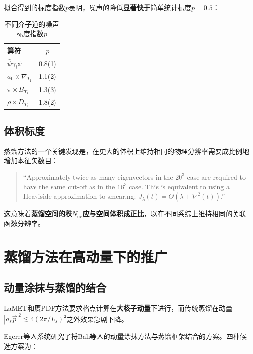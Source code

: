 \documentclass[12pt,a4paper]{ctexart}
\theoremstyle{definition}
\begin{document}
拟合得到的标度指数$p$表明，噪声的降低\textbf{显著快于}简单统计标度$p = 0.5$：

\begin{table}[H]
\centering
\caption{不同介子道的噪声标度指数$p$\cite{Peardon2009}}
\label{tab:noise_exponents}
\begin{tabular}{lc}
\toprule
算符 & $p$ \\
\midrule
$\bar{\psi}\gamma_i\psi$               & 0.8(1)  \\
$a_0 \times \nabla_{T_1}$             & 1.1(2)  \\
$\pi \times B_{T_1}$                  & 1.3(3)  \\
$\rho \times D_{T_1}$                 & 1.8(2)  \\
\bottomrule
\end{tabular}
\end{table}

\subsection{体积标度}

蒸馏方法的一个关键发现是，在更大的体积上维持相同的物理分辨率需要成比例地增加本征矢数目\cite{Peardon2009}：

\begin{quote}
``Approximately twice as many eigenvectors in the $20^3$ case are required to have the same cut-off as in the $16^3$ case. This is equivalent to using a Heaviside approximation to smearing: $J_\lambda(t) = \Theta(\lambda + \nabla^2(t))$.''\cite{Peardon2009}
\end{quote}

这意味着\textbf{蒸馏空间的秩$N_{\text{ev}}$应与空间体积成正比}，以在不同系综上维持相同的关联函数分辨率\cite{Peardon2009,Egerer2021a}。

\section{蒸馏方法在高动量下的推广}

\subsection{动量涂抹与蒸馏的结合}

LaMET和赝PDF方法要求格点计算在\textbf{大核子动量}下进行，而传统蒸馏在动量$|a_s\vec{p}|^2 \lesssim 4(2\pi/L_s)^2$之外效果急剧下降\cite{Egerer2021a}。

Egerer等人\cite{Egerer2021a}系统研究了将Bali等人的动量涂抹方法与蒸馏框架结合的方案。四种候选方案为：
\end{document}

